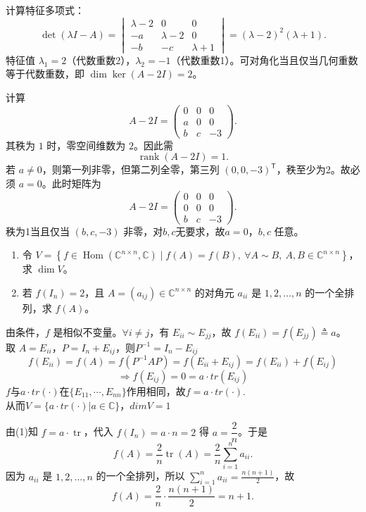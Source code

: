 \documentclass[lang=cn,12pt]{elegantbook}
\begin{document}
\begin{solution}
计算特征多项式：
\[
\det(\lambda I - A) = 
\begin{vmatrix}
\lambda-2 & 0 & 0 \\
-a & \lambda-2 & 0 \\
-b & -c & \lambda+1
\end{vmatrix}
= (\lambda-2)^2 (\lambda+1).
\]
特征值 \(\lambda_1 = 2\)（代数重数2），\(\lambda_2 = -1\)（代数重数1）。可对角化当且仅当几何重数等于代数重数，即 \(\dim \ker(A - 2I) = 2\)。

计算
\[
A - 2I = \begin{pmatrix}
0 & 0 & 0 \\
a & 0 & 0 \\
b & c & -3
\end{pmatrix}.
\]
其秩为 \(1\) 时，零空间维数为 \(2\)。因此需
\[
\operatorname{rank}(A-2I) = 1.
\]
若 \(a \neq 0\)，则第一列非零，但第二列全零，第三列 \( (0,0,-3)^{\mathsf{T}} \)，秩至少为2。故必须 \(a = 0\)。此时矩阵为
\[
A - 2I = \begin{pmatrix}
0 & 0 & 0 \\
0 & 0 & 0 \\
b & c & -3
\end{pmatrix}.
\]
秩为1当且仅当 \((b,c,-3)\) 非零，对$b,c$无要求，故\(a=0\)，\(b,c\) 任意。
\end{solution}
  
\begin{example}
    \begin{enumerate}
        \item[(1)] 令 \(V = \left\{ f \in \operatorname{Hom}(\mathbb{C}^{n \times n}, \mathbb{C}) \mid f(A) = f(B),\ \forall A \sim B,\ A,B \in \mathbb{C}^{n \times n} \right\}\)，求 \(\dim V\)。
        
        \item[(2)] 若 \(f(I_n) = 2\)，且 \(A = (a_{ij}) \in \mathbb{C}^{n \times n}\) 的对角元 \(a_{ii}\) 是 \(1,2,\dots,n\) 的一个全排列，求 \(f(A)\)。
    \end{enumerate}
\end{example}

\begin{solution}
    由条件，\(f\) 是相似不变量。\(\forall i\neq j\)，有 \(E_{ii} \sim E_{jj}\)，故 \(f(E_{ii}) = f(E_{jj}) \triangleq a\)。\\
    取 \(A = E_{ii}\)，$P = I_n + E_{ij}$，则$P^{-1} = I_n - E_{ij}$ 
    $$f(E_{ii}) = f(A) = f(P^{-1} AP) = f(E_{ii}+ E_{ij} ) = f(E_{ii}) + f(E_{ij})$$
    $$
    \Rightarrow f(E_{ij}) = 0  = a \cdot tr(E_{ij})
    $$
    $f$与$a \cdot tr(\cdot) $在$\{E_{11},\cdots,E_{nn}\}$作用相同，故$f = a \cdot tr(\cdot)$.\\
    从而$V = \{a \cdot tr(\cdot) | a \in \mathbb{C}\}$，$dimV = 1$

    由(1)知 \(f = a \cdot \operatorname{tr}\)，代入 \(f(I_n) = a \cdot n = 2\) 得 \(a = \dfrac{2}{n}\)。于是
    \[
    f(A) = \frac{2}{n} \operatorname{tr}(A) = \frac{2}{n} \sum_{i=1}^n a_{ii}.
    \]
    因为 \(a_{ii}\) 是 \(1,2,\dots,n\) 的一个全排列，所以 \(\sum_{i=1}^n a_{ii} =  \frac{n(n+1)}{2}\)，故
    \[
    f(A) = \frac{2}{n} \cdot \frac{n(n+1)}{2} = n+1.
    \]
\end{solution}
\end{document}
